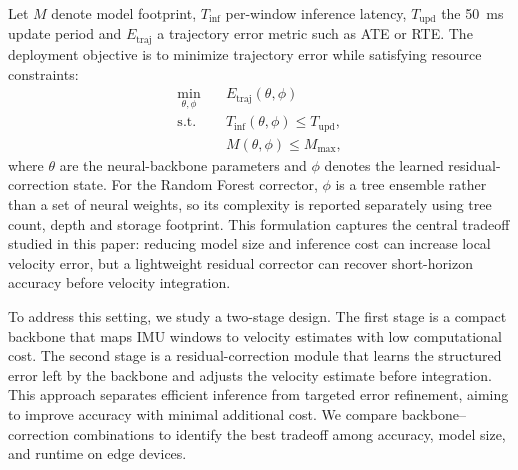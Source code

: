 \documentclass[10pt,conference,letterpaper]{IEEEtran}
\begin{document}
Let $M$ denote model footprint, $T_{\mathrm{inf}}$ per-window inference
latency, $T_{\mathrm{upd}}$ the 50~ms update period and
$E_{\mathrm{traj}}$ a trajectory error metric such as ATE or RTE. The
deployment objective is to minimize trajectory error while satisfying
resource constraints:
\begin{equation}
\begin{aligned}
\min_{\theta,\phi} \quad & E_{\mathrm{traj}}(\theta,\phi) \\
\mathrm{s.t.} \quad & T_{\mathrm{inf}}(\theta,\phi) \leq T_{\mathrm{upd}},\\
& M(\theta,\phi) \leq M_{\max},
\end{aligned}
\label{eq:objective}
\end{equation}
where $\theta$ are the neural-backbone parameters and $\phi$ denotes the
learned residual-correction state. For the Random Forest corrector,
$\phi$ is a tree ensemble rather than a set of neural weights, so its
complexity is reported separately using tree count, depth and storage
footprint. This formulation captures the central tradeoff studied in
this paper: reducing model size and inference cost can increase local
velocity error, but a lightweight residual corrector can recover
short-horizon accuracy before velocity integration.

To address this setting, we study a two-stage design. The first stage is a compact backbone that maps IMU windows to velocity estimates with low computational cost. The second stage is a residual-correction module that learns the structured error left by the backbone and adjusts the velocity estimate before integration. This approach separates efficient inference from targeted error refinement, aiming to improve accuracy with minimal additional cost. We compare backbone--correction combinations to identify the best tradeoff among accuracy, model size, and runtime on edge devices.


\end{document}
